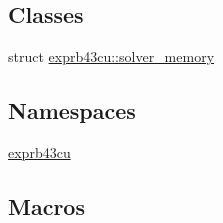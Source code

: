 \subsection*{Classes}
\begin{DoxyCompactItemize}
\item 
struct \hyperlink{structexprb43cu_1_1solver__memory}{exprb43cu\+::solver\+\_\+memory}
\end{DoxyCompactItemize}
\subsection*{Namespaces}
\begin{DoxyCompactItemize}
\item 
 \hyperlink{namespaceexprb43cu}{exprb43cu}
\end{DoxyCompactItemize}
\subsection*{Macros}
